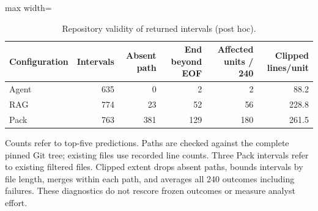 \begin{table}[t]
\centering\small
\caption{Repository validity of returned intervals (post hoc).}\label{tab:location-validity}
\begin{adjustbox}{max width=\textwidth}\begin{tabular}{lrrrrr}
\toprule
Configuration & Intervals & Absent path & End beyond EOF & Affected units / 240 & Clipped lines/unit \\
\midrule
Agent & 635 & 0 & 2 & 2 & 88.2 \\
RAG & 774 & 23 & 52 & 56 & 228.8 \\
Pack & 763 & 381 & 129 & 180 & 261.5 \\
\bottomrule
\end{tabular}\end{adjustbox}
\par\vspace{3pt}\begin{minipage}{\textwidth}\footnotesize Counts refer to top-five predictions. Paths are checked against the complete pinned Git tree; existing files use recorded line counts. Three Pack intervals refer to existing filtered files. Clipped extent drops absent paths, bounds intervals by file length, merges within each path, and averages all 240 outcomes including failures. These diagnostics do not rescore frozen outcomes or measure analyst effort.\end{minipage}
\end{table}
